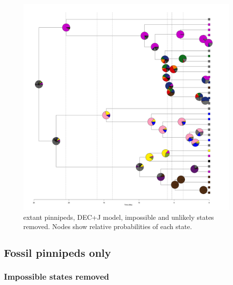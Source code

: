 \documentclass[a4paper, 12pt]{article}
\begin{document}
\begin{figure}[H]
 \centering
  \includegraphics[width = \linewidth]{figures/extant-pinnipeds-DECj-unlikely-pies.png}
 \caption{extant pinnipeds, DEC+J model, impossible and unlikely states removed. Nodes show relative probabilities of each state.}
  \label{fig-extant-decj-pie-unlikely}
\end{figure} 

\subsection{Fossil pinnipeds only}
\subsubsection{Impossible states removed}
\end{document}
